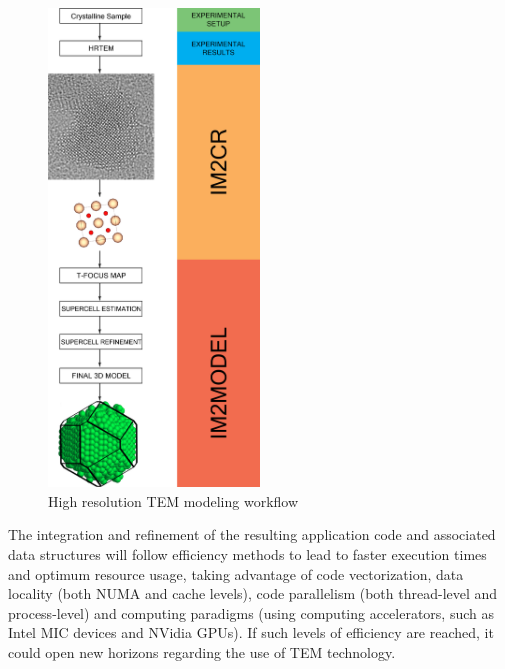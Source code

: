 \documentclass[
  oneside,
  11pt, a4paper,
  footinclude=true,
  headinclude=true,
  cleardoublepage=empty
]{scrbook}
\begin{document}
\begin{figure}[!ht]
	\begin{center}
	
	\includegraphics[width=0.5\textwidth]{img/workflow.png}
			\caption{High resolution TEM modeling workflow}
	\label{fig:tem_modeling_workflow}
		\end{center}
	\end{figure}
	
	\FloatBarrier
	
	\label{chapter:workflow}
	
	
The integration and refinement of the resulting application code and associated data structures will
follow efficiency methods to lead to faster execution times and optimum resource usage, taking
advantage of code vectorization, data locality (both NUMA and cache levels), code parallelism (both
thread-level and process-level) and computing paradigms (using computing accelerators, such as Intel
MIC devices and NVidia GPUs). If such levels of efficiency are reached, it could open new horizons regarding the use of TEM technology.



\label{chapter:im2model_workflow}
\end{document}
